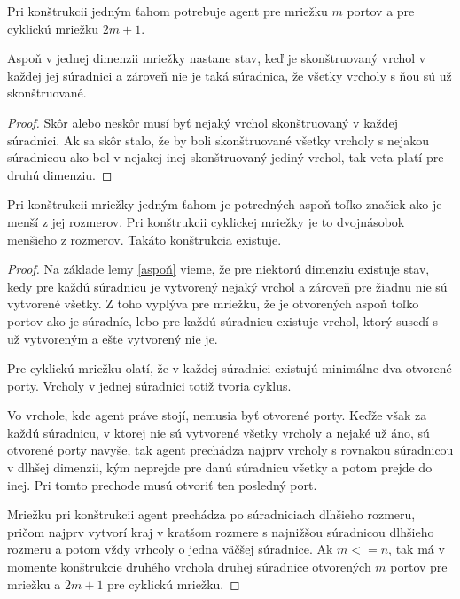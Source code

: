 Pri konštrukcii jedným ťahom potrebuje agent pre mriežku $m$ portov a pre
cyklickú mriežku $2m + 1$.

\begin{lem}
\label{aspoň}
Aspoň v jednej dimenzii mriežky nastane stav, keď je skonštruovaný vrchol v každej
jej súradnici a zároveň nie je taká súradnica, že všetky vrcholy s ňou sú už
skonštruované.
\end{lem}

\begin{proof}
Skôr alebo neskôr musí byť nejaký vrchol skonštruovaný v každej súradnici.
Ak sa skôr stalo, že by boli skonštruované všetky vrcholy s nejakou
súradnicou ako bol v nejakej inej skonštruovaný jediný vrchol, tak veta
platí pre druhú dimenziu.
\end{proof}

\begin{veta}
Pri konštrukcii mriežky jedným ťahom je potredných aspoň toľko značiek ako
je menší z jej rozmerov. Pri konštrukcii cyklickej mriežky je to dvojnásobok
menšieho z rozmerov. Takáto konštrukcia existuje.
\end{veta}
\begin{proof}
Na základe lemy \ref{aspoň} vieme, že pre niektorú dimenziu existuje stav,
kedy pre každú súradnicu je vytvorený nejaký vrchol a zároveň pre žiadnu nie
sú vytvorené všetky. Z toho vyplýva pre mriežku, že je otvorených aspoň
toľko portov ako je súradníc, lebo pre každú súradnicu existuje vrchol,
ktorý susedí s už vytvoreným a ešte vytvorený nie je.

Pre cyklickú mriežku olatí, že v každej súradnici existujú minimálne dva
otvorené porty. Vrcholy v jednej súradnici totiž tvoria cyklus.

Vo vrchole, kde agent práve stojí, nemusia byť otvorené porty. Keďže však za
každú súradnicu, v ktorej nie sú vytvorené všetky vrcholy a nejaké už áno,
sú otvorené porty navyše, tak agent prechádza najprv vrcholy s rovnakou 
súradnicou v dlhšej dimenzii, kým neprejde pre danú súradnicu všetky a potom
prejde do inej. Pri tomto prechode musú otvoriť ten posledný port.

Mriežku pri konštrukcii agent prechádza po súradniciach dlhšieho rozmeru,
pričom najprv vytvorí kraj v kratšom rozmere s najnižšou súradnicou dlhšieho
rozmeru a potom vždy vrhcoly o jedna väčšej súradnice. Ak $m <= n$, tak má v
momente konštrukcie druhého vrchola druhej súradnice otvorených $m$ portov
pre mriežku a $2m + 1$ pre cyklickú mriežku.
\end{proof}



